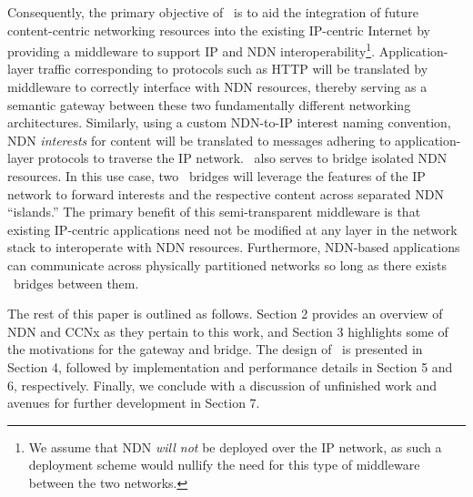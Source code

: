 Consequently, the primary objective of \sink\ is to aid the integration of future content-centric networking resources into the existing IP-centric Internet by providing a middleware to support IP and NDN interoperability\footnote{We assume that NDN \emph{will not} be deployed over the IP network, as such a deployment scheme would nullify the need for this type of middleware between the two networks.}. Application-layer traffic corresponding to protocols such as HTTP will be translated by middleware to correctly interface with NDN resources, thereby serving as a semantic gateway between these two fundamentally different networking architectures. Similarly, using a custom NDN-to-IP interest naming convention, NDN \emph{interests} for content will be translated to messages adhering to application-layer protocols to traverse the IP network. \sink\ also serves to bridge isolated NDN resources. In this use case, two \sink\ bridges will leverage the features of the IP network to forward interests and the respective content across separated NDN ``islands.'' The primary benefit of this semi-transparent middleware is that existing IP-centric applications need not be modified at any layer in the network stack to interoperate with NDN resources. Furthermore, NDN-based applications can communicate across physically partitioned networks so long as there exists \sink\ bridges between them. 

The rest of this paper is outlined as follows. Section 2 provides an overview of NDN and CCNx as they pertain to this work, and Section 3 highlights some of the motivations for the gateway and bridge. The design of \sink\ is presented in Section 4, followed by implementation and performance details in Section 5 and 6, respectively. Finally, we conclude with a discussion of unfinished work and avenues for further development in Section 7. 





